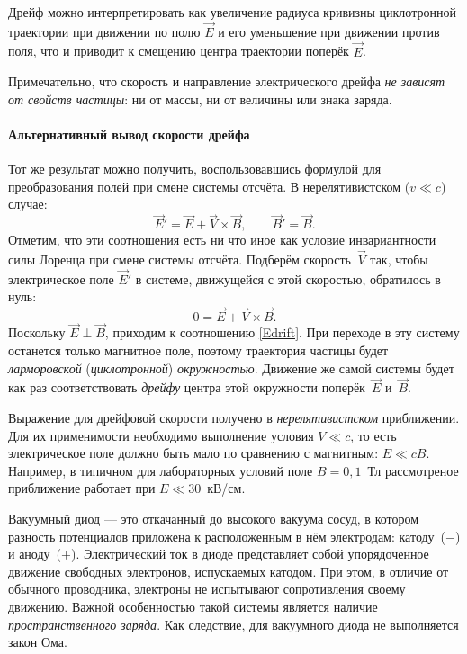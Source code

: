 Дрейф можно интерпретировать как увеличение радиуса кривизны циклотронной
траектории при движении по полю $\vec{E}$ и его уменьшение при движении
против поля, что и приводит к смещению центра траектории поперёк $\vec{E}$.

Примечательно, что скорость и направление электрического дрейфа
\emph{не зависят от свойств частицы}: ни от массы,
ни от величины или знака заряда.


\paragraph{Альтернативный вывод скорости дрейфа}
Тот же результат можно получить, воспользовавшись формулой для
преобразования полей при смене системы отсчёта. В нерелятивистском
($v\ll c$) случае:
\[
\vec{E}' = \vec{E} + \vec{V}\times \vec{B},\qquad \vec{B}'=\vec{B}.
\]
Отметим, что эти соотношения есть ни что иное как условие инвариантности силы
Лоренца при смене системы отсчёта. Подберём скорость~$\vec{V}$ так, чтобы
электрическое поле $\vec{E}'$ в системе, движущейся с этой скоростью, обратилось
в нуль:
\[
 0 = \vec{E} + \vec{V}\times \vec{B}.
\]
Поскольку $\vec{E}\perp \vec{B}$, приходим к соотношению \eqref{Edrift}.
При переходе в эту систему останется только магнитное поле, поэтому
траектория частицы будет \emph{ларморовской} (\emph{циклотронной})
\emph{окружностью}. Движение же самой системы будет как раз соответствовать
\emph{дрейфу} центра этой окружности поперёк~$\vec{E}$ и~$\vec{B}$.

\begin{lab:note}
Выражение для дрейфовой скорости получено в \emph{нерелятивистском}
приближении. Для их применимости необходимо выполнение условия $V\ll c$,
то есть электрическое поле должно быть мало по сравнению с магнитным: $E\ll cB$.
Например, в типичном для лабораторных условий поле $B=0,1$~Тл рассмотреное приближение 
работает при $E \ll  30$~кВ/см.
\end{lab:note}


\label{sec:vac_di}

Вакуумный диод --- это откачанный до высокого вакуума сосуд,
в котором разность потенциалов приложена к расположенным в нём электродам:
катоду~($-$) и аноду~($+$). Электрический ток в диоде представляет собой упорядоченное
движение свободных электронов, испускаемых катодом.  При этом,
в отличие от обычного проводника, электроны не испытывают сопротивления
своему движению. Важной особенностью такой системы
является наличие \emph{пространственного заряда}. Как следствие, для вакуумного
диода не выполняется закон Ома.

